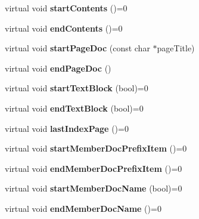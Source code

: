 \begin{DoxyCompactItemize}
virtual void {\bfseries start\+Contents} ()=0
\item 
\mbox{\label{class_output_generator_a62d0b8915ba8cbae0e0703794bcae68a}} 
virtual void {\bfseries end\+Contents} ()=0
\item 
\mbox{\label{class_output_generator_a0d77f64cb69172617565d1b0c5313ab7}} 
virtual void {\bfseries start\+Page\+Doc} (const char $\ast$page\+Title)
\item 
\mbox{\label{class_output_generator_a3a1428cad9acebb7720ff09ce1488957}} 
virtual void {\bfseries end\+Page\+Doc} ()
\item 
\mbox{\label{class_output_generator_ae06da65c60fe1508152999a76c3b8d80}} 
virtual void {\bfseries start\+Text\+Block} (bool)=0
\item 
\mbox{\label{class_output_generator_a53f79d9816008132480d3d454e14251b}} 
virtual void {\bfseries end\+Text\+Block} (bool)=0
\item 
\mbox{\label{class_output_generator_a12d53790300c52b68bc0715ab05507d2}} 
virtual void {\bfseries last\+Index\+Page} ()=0
\item 
\mbox{\label{class_output_generator_acbb6ecd186cadcea8526b54e2ba7d166}} 
virtual void {\bfseries start\+Member\+Doc\+Prefix\+Item} ()=0
\item 
\mbox{\label{class_output_generator_a8fa59aa64d420ced1d1784f7b2ddaa79}} 
virtual void {\bfseries end\+Member\+Doc\+Prefix\+Item} ()=0
\item 
\mbox{\label{class_output_generator_a8646f44dc5c56ef3f6d5fa3f667cd223}} 
virtual void {\bfseries start\+Member\+Doc\+Name} (bool)=0
\item 
\mbox{\label{class_output_generator_a02431abad8b2d94216a0530cf08b3dca}} 
virtual void {\bfseries end\+Member\+Doc\+Name} ()=0
\item 
\mbox{\label{class_output_generator_a76af87c960b045eafa035b77307aaf75}} 

\end{DoxyCompactItemize}
